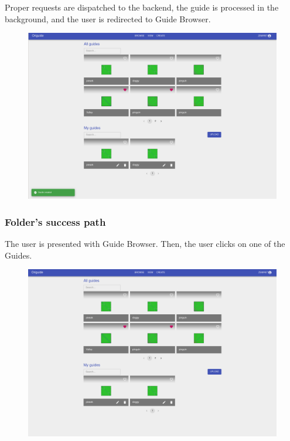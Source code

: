 Proper requests are dispatched to the backend, the guide is processed in the background, and
the user is redirected to Guide Browser.

\begin{figure}[H]
  	\centering
    \includegraphics[width=\textwidth]{assets/5-designerBrowser.png}
\end{figure}

\clearpage
\subsubsection{Folder's success path}

The user is presented with Guide Browser. Then, the user clicks on one of the Guides.

\begin{figure}[H]
  	\centering
    \includegraphics[width=\textwidth]{assets/5-folderOpen.png}
\end{figure}

